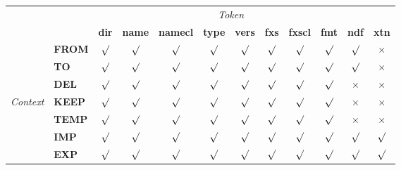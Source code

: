 \documentclass[11pt,twoside,nolof]{starlink}
\providecommand{\st}[1]{{\em{#1}}}
\begin{document}
\providecommand{\yes}[0]{$\surd$}
\providecommand{\no}[0]{$\times$}
\begin{center}
\begin{tabular}{r|l|cccccccccc|}
\multicolumn{2}{c}{}&\multicolumn{9}{c}{\st{Token}}\\
\cline{3-12}
\multicolumn{2}{c|}{}&\textbf{dir}&\textbf{name}&\textbf{namecl}&\textbf{type}&\textbf{vers}
&\textbf{fxs}&\textbf{fxscl}&\textbf{fmt}&\textbf{ndf}&\textbf{xtn}\\
\cline{2-12}
&\textbf{FROM} & \yes & \yes & \yes & \yes & \yes & \yes & \yes & \yes & \yes & \no \\
&\textbf{TO}   & \yes & \yes & \yes & \yes & \yes & \yes & \yes & \yes & \yes & \no \\
&\textbf{DEL}  & \yes & \yes & \yes & \yes & \yes & \yes & \yes & \yes & \no  & \no \\
\st{Context} &\textbf{KEEP} & \yes & \yes & \yes & \yes & \yes & \yes & \yes & \yes & \no  & \no \\
&\textbf{TEMP} & \yes & \yes & \yes & \yes & \yes & \yes & \yes & \yes & \no & \no \\
&\textbf{IMP}  & \yes & \yes & \yes & \yes & \yes & \yes & \yes & \yes & \yes & \yes \\
&\textbf{EXP}  & \yes & \yes & \yes & \yes & \yes & \yes & \yes & \yes & \yes & \yes \\
\cline{2-12}
\end{tabular}
\end{center}
\end{document}
